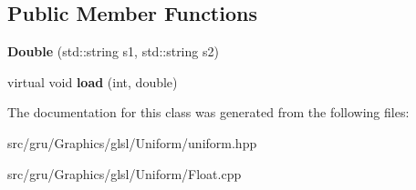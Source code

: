 \subsection*{\-Public \-Member \-Functions}
\begin{DoxyCompactItemize}
\item 
\hypertarget{classglutpp_1_1glsl_1_1Uniform_1_1Vector_1_1Double_a6c3780c4a75eebcee037d37266997f4f}{{\bfseries \-Double} (std\-::string s1, std\-::string s2)}\label{classglutpp_1_1glsl_1_1Uniform_1_1Vector_1_1Double_a6c3780c4a75eebcee037d37266997f4f}

\item 
\hypertarget{classglutpp_1_1glsl_1_1Uniform_1_1Vector_1_1Double_a36ccba58e251e22e3bffa875ae4491fc}{virtual void {\bfseries load} (int, double)}\label{classglutpp_1_1glsl_1_1Uniform_1_1Vector_1_1Double_a36ccba58e251e22e3bffa875ae4491fc}

\end{DoxyCompactItemize}


\-The documentation for this class was generated from the following files\-:\begin{DoxyCompactItemize}
\item 
src/gru/\-Graphics/glsl/\-Uniform/uniform.\-hpp\item 
src/gru/\-Graphics/glsl/\-Uniform/\-Float.\-cpp\end{DoxyCompactItemize}
